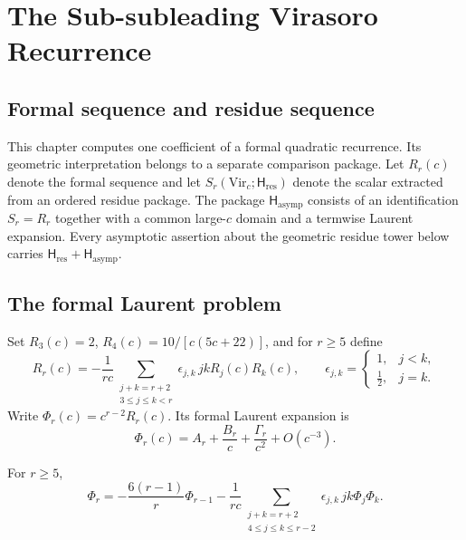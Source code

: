 
\providecommand{\Vir}{\mathrm{Vir}}
\providecommand{\ClaimStatusProvedHere}{}
\providecommand{\ClaimStatusConditional}{}
\providecommand{\ClaimStatusDefinitional}{}
\providecommand{\ClaimStatusOpen}{}

\chapter{The Sub-subleading Virasoro Recurrence}
\label{ch:shadow-tower-sub-subleading-platonic}

\section*{Formal sequence and residue sequence}

This chapter computes one coefficient of a formal quadratic
recurrence.  Its geometric interpretation belongs to a separate
comparison package.  Let \(R_r(c)\) denote the formal sequence and let
\(S_r(\Vir_c;\mathsf H_{\mathrm{res}})\) denote the scalar extracted
from an ordered residue package.  The package
\(\mathsf H_{\mathrm{asymp}}\) consists of an identification
\(S_r=R_r\) together with a common large-\(c\) domain and a termwise
Laurent expansion.  Every asymptotic assertion about the geometric
residue tower below carries
\(\mathsf H_{\mathrm{res}}+\mathsf H_{\mathrm{asymp}}\).

\section{The formal Laurent problem}
\label{sec:stss-setup}

\begin{definition}
\label{def:phi-laurent}
\ClaimStatusDefinitional
Set \(R_3(c)=2\), \(R_4(c)=10/[c(5c+22)]\), and for \(r\ge5\) define
\[
 R_r(c)=-\frac1{rc}
 \sum_{\substack{j+k=r+2\\3\le j\le k<r}}
 \epsilon_{j,k}\,jkR_j(c)R_k(c),
 \qquad
 \epsilon_{j,k}=\begin{cases}1,&j<k,\\[2pt]\frac12,&j=k.\end{cases}
\]
Write \(\Phi_r(c)=c^{r-2}R_r(c)\).  Its formal Laurent expansion is
\[
 \Phi_r(c)=A_r+\frac{B_r}{c}+\frac{\Gamma_r}{c^2}+O(c^{-3}).
\]
\end{definition}

\begin{lemma}
\label{lem:phi-recurrence}
\ClaimStatusProvedHere
For \(r\ge5\),
\[
 \Phi_r=-\frac{6(r-1)}r\Phi_{r-1}
 -\frac1{rc}
 \sum_{\substack{j+k=r+2\\4\le j\le k\le r-2}}
 \epsilon_{j,k}\,jk\Phi_j\Phi_k.
\]
\end{lemma}

